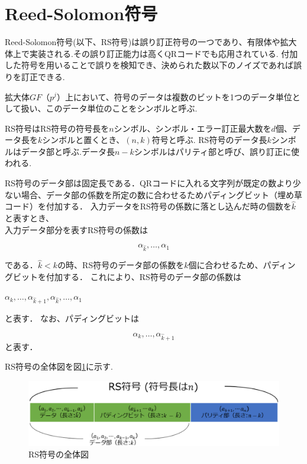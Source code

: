 \documentclass{thesis}
\begin{document}
\section{Reed-Solomon符号}

Reed-Solomon符号(以下、RS符号)は誤り訂正符号の一つであり、有限体や拡大体上で実装される.その誤り訂正能力は高くQRコードでも応用されている.
付加した符号を用いることで誤りを検知でき、決められた数以下のノイズであれば誤りを訂正できる.

拡大体$GF（p^j）$上において、符号のデータは複数のビットを1つのデータ単位として扱い、このデータ単位のことをシンボルと呼ぶ.

RS符号はRS符号の符号長を$n$シンボル、シンボル・エラー訂正最大数を$d$個、データ長を$k$シンボルと置くとき、$(n,k)$符号と呼ぶ.
RS符号のデータ長$k$シンボルはデータ部と呼ぶ.データ長$n-k$シンボルはパリティ部と呼び、誤り訂正に使われる.


RS符号のデータ部は固定長である．QRコードに入れる文字列が既定の数より少ない場合、データ部の係数を所定の数に合わせるためパディングビット（埋め草コード）を付加する．
入力データをRS符号の係数に落とし込んだ時の個数を$\hat{k}$と表すとき、\\
入力データ部分を表すRS符号の係数は

\begin{equation}
\alpha_{\hat{k}},…,\alpha_1
\label{eq:pol1}
\end{equation}

である．$\hat{k} < k$の時、RS符号のデータ部の係数を$k$個に合わせるため、パディングビットを付加する．
これにより、RS符号のデータ部の係数は

\begin{center}
$\alpha_{k},…,\alpha_{\hat{k} + 1},\alpha_{\hat{k}},…,\alpha_1$
\end{center}
と表す．
なお、パディングビットは
 
 \begin{equation}
 \alpha_{k},…,\alpha_{\hat{k} + 1}
\label{eq:pol3}
\end{equation}
と表す．\\

\newpage

RS符号の全体図を図\ref{RScode}に示す.

\begin{figure}[H]
 \centering
 \includegraphics[width=1\linewidth]{pic/RScode.eps}
 \caption{RS符号の全体図\label{RScode}}
\end{figure}
\end{document}
